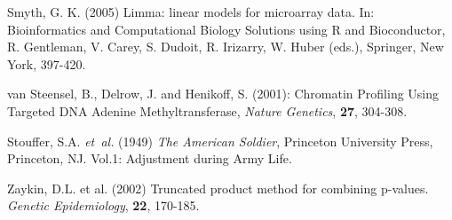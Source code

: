 \documentclass{bioinfo}
\begin{document}
\begin{thebibliography}{}
Smyth, G. K. (2005) Limma: linear models for microarray data. In: Bioinformatics and Computational Biology Solutions using R and Bioconductor, R. Gentleman, V. Carey, S. Dudoit, R. Irizarry, W. Huber (eds.), Springer, New York, 397-420.

van Steensel, B., Delrow, J. and Henikoff, S. (2001):
Chromatin Profiling Using Targeted DNA Adenine Methyltransferase,
{\it Nature Genetics}, {\bf 27}, 304-308.

Stouffer, S.A. \textit{et~al.} (1949) \textit{The American Soldier},
Princeton University Press, Princeton, NJ. Vol.1: Adjustment during Army Life.


 Zaykin, D.L. et al. (2002)
Truncated product method for combining p-values. {\it Genetic Epidemiology},
{\bf 22}, 170-185.


\end{thebibliography}
\end{document}
